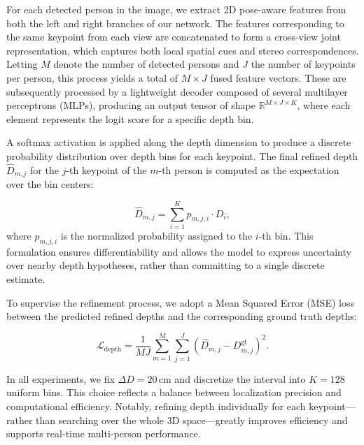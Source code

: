 \documentclass[journal]{IEEEtran}
\begin{document}
For each detected person in the image, we extract 2D pose-aware features from both the left and right branches of our network. The features corresponding to the same keypoint from each view are concatenated to form a cross-view joint representation, which captures both local spatial cues and stereo correspondences. Letting $M$ denote the number of detected persons and $J$ the number of keypoints per person, this process yields a total of $M \times J$ fused feature vectors. These are subsequently processed by a lightweight decoder composed of several multilayer perceptrons (MLPs), producing an output tensor of shape $\mathbb{R}^{M \times J \times K}$, where each element represents the logit score for a specific depth bin.

A softmax activation is applied along the depth dimension to produce a discrete probability distribution over depth bins for each keypoint. The final refined depth $\hat{D}_{m,j}$ for the $j$-th keypoint of the $m$-th person is computed as the expectation over the bin centers:

\begin{equation}
\hat{D}_{m,j} = \sum_{i=1}^{K} p_{m,j,i} \cdot D_i,
\end{equation}
where $p_{m,j,i}$ is the normalized probability assigned to the $i$-th bin. This formulation ensures differentiability and allows the model to express uncertainty over nearby depth hypotheses, rather than committing to a single discrete estimate.

To supervise the refinement process, we adopt a Mean Squared Error (MSE) loss between the predicted refined depths and the corresponding ground truth depths:

\begin{equation}
\mathcal{L}_{\text{depth}} = \frac{1}{M J} \sum_{m=1}^{M} \sum_{j=1}^{J} \left( \hat{D}_{m,j} - D^{\text{gt}}_{m,j} \right)^2.
\end{equation}

In all experiments, we fix $\Delta D = 20\,\text{cm}$ and discretize the interval into $K = 128$ uniform bins. This choice reflects a balance between localization precision and computational efficiency. Notably, refining depth individually for each keypoint—rather than searching over the whole 3D space—greatly improves efficiency and supports real-time multi-person performance.
\end{document}
